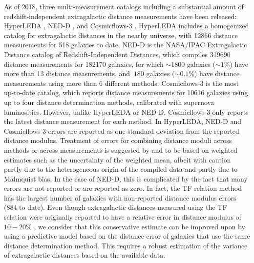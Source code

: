\documentclass[a4paper,fleqn,usenatbib]{mnras}
\begin{document}
As of 2018, three multi-measurement catalogs including a substantial amount of redshift-independent extragalactic distance measurements have been released: HyperLEDA \citep{hyperleda}, NED-D \citep{ned07,ned}, and Cosmicflows-3 \citep{cosmicflows}. HyperLEDA includes a homogenized catalog for extragalactic distances in the nearby universe, with 12866 distance measurements for 518 galaxies to date. NED-D is the NASA/IPAC Extragalactic Distance catalog of Redshift-Independent Distances, which compiles 319690 distance measurements for 182170 galaxies, for which  $\sim1800$ galaxies ($\sim1$\%) have more than 13 distance measurements, and $~180$ galaxies ($\sim0.1$\%) have distance measurements using more than 6 different methods. Cosmicflows-3 is the most up-to-date catalog, which reports distance measurements for 10616 galaxies using up to four distance determination methods, calibrated with supernova luminosities. However, unlike HyperLEDA or NED-D, Cosmicflows-3 only reports the latest distance measurement for each method. In HyperLEDA, NED-D and Cosmicflows-3 errors are reported as one standard deviation from the reported distance modulus. Treatment of errors for combining distance moduli across methods or across measurements is suggested by \citet{ned07} and \citet{cosmicflows} to be based on weighted estimates such as the uncertainty of the weighted mean, albeit with caution partly due to the heterogeneous origin of the compiled data and partly due to Malmquist bias. In the case of NED-D, this is complicated by the fact that many errors are not reported or are reported as zero. In fact, the TF relation method has the largest number of galaxies with non-reported distance modulus errors (884 to date). Even though extragalactic distances measured using the TF relation were originally reported to have a relative error in distance modulus of $10-20$\% \citep{tforig}, we consider that this conservative estimate can be improved upon by using a predictive model based on the distance error of galaxies that use the same distance determination method. This requires a robust estimation of the variance of extragalactic distances based on the available data.\\
\end{document}
